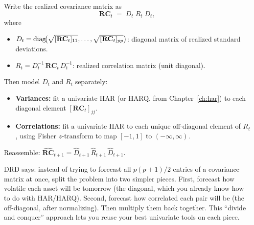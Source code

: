 \begin{keyidea}
Write the realized covariance matrix as
\begin{equation}\label{eq:drd}
  \mathbf{RC}_t \;=\; D_t\; R_t\; D_t,
\end{equation}
where
\begin{itemize}[nosep]
  \item $D_t = \operatorname{diag}\!\bigl(\sqrt{[\mathbf{RC}_t]_{11}}, \ldots,
        \sqrt{[\mathbf{RC}_t]_{pp}}\bigr)$: diagonal matrix of realized
        standard deviations.
  \item $R_t = D_t^{-1}\,\mathbf{RC}_t\, D_t^{-1}$: realized correlation
        matrix (unit diagonal).
\end{itemize}
Then model $D_t$ and $R_t$ separately:
\begin{itemize}[nosep]
  \item \textbf{Variances:} fit a univariate HAR (or HARQ, from
        Chapter~\ref{ch:har}) to each diagonal element $[\mathbf{RC}_t]_{jj}$.
  \item \textbf{Correlations:} fit a univariate HAR to each unique off-diagonal
        element of $R_t$, using Fisher $z$-transform to map $[-1,1]$ to
        $(-\infty, \infty)$.
\end{itemize}
Reassemble: $\widehat{\mathbf{RC}}_{t+1} = \hat{D}_{t+1}\,\hat{R}_{t+1}\,\hat{D}_{t+1}$.
\end{keyidea}

\begin{intuition}
DRD says: instead of trying to forecast all $p(p+1)/2$ entries of a covariance
matrix at once, split the problem into two simpler pieces. First, forecast how
volatile each asset will be tomorrow (the diagonal, which you already know how
to do with HAR/HARQ). Second, forecast how correlated each pair will be (the
off-diagonal, after normalizing). Then multiply them back together. This
``divide and conquer'' approach lets you reuse your best univariate tools on
each piece.
\end{intuition}

